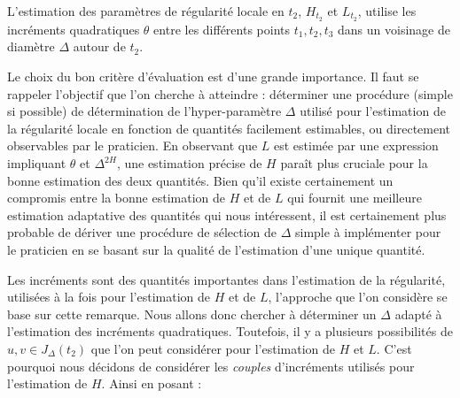 

L'estimation des paramètres de régularité locale en $t_2$, $H_{t_2}$ et $L_{t_2}$, utilise les incréments quadratiques $\theta$ entre les différents points $t_1, t_2, t_3$ dans un voisinage de diamètre $\Delta$ autour de $t_2$. 


Le choix du bon critère d'évaluation est d'une grande importance. Il faut se rappeler l'objectif que l'on cherche à atteindre : déterminer une procédure (simple si possible) de détermination de l'hyper-paramètre $\Delta$ utilisé pour l'estimation de la régularité locale en fonction de quantités facilement estimables, ou directement observables par le praticien. En observant que $L$ est estimée par une expression impliquant $\theta$ et $\Delta^{2 H}$, une estimation précise de $H$ paraît plus cruciale pour la bonne estimation des deux quantités. Bien qu'il existe certainement un compromis entre la bonne estimation de $H$ et de $L$ qui fournit une meilleure estimation adaptative des quantités qui nous intéressent, il est certainement plus probable de dériver une procédure de sélection de $\Delta$ simple à implémenter pour le praticien en se basant sur la qualité de l'estimation d'une unique quantité.


Les incréments sont des quantités importantes dans l'estimation de la régularité, utilisées à la fois pour l'estimation de $H$ et de $L$, l'approche que l'on considère se base sur cette remarque. Nous allons donc chercher à déterminer un $\Delta$ adapté à l'estimation des incréments quadratiques. Toutefois, il y a plusieurs possibilités de $u,v \in J_\Delta(t_2)$ que l'on peut considérer pour l'estimation de $H$ et $L$. C'est pourquoi nous décidons de considérer les \emph{couples} d'incréments utilisés pour l'estimation de $H$. Ainsi en posant :

